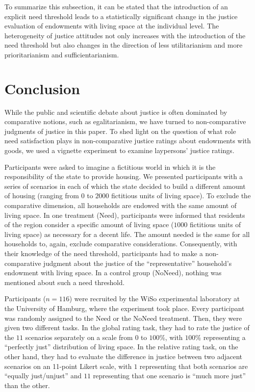 \documentclass[12pt]{scrartcl}
\begin{document}
To summarize this subsection, it can be stated that the introduction of an explicit need threshold leads to a statistically significant change in the justice evaluation of endowments with living space at the individual level.
The heterogeneity of justice attitudes not only increases with the introduction of the need threshold but also changes in the direction of less utilitarianism and more prioritarianism and sufficientarianism.


\section{Conclusion}\label{sec:conclusion}
While the public and scientific debate about justice is often dominated by comparative notions, such as egalitarianism, we have turned to non-comparative judgments of justice in this paper.
To shed light on the question of what role need satisfaction plays in non-comparative justice ratings about endowments with goods, we used a vignette experiment to examine laypersons' justice ratings.

Participants were asked to imagine a fictitious world in which it is the responsibility of the state to provide housing.
We presented participants with a series of scenarios in each of which the state decided to build a different amount of housing (ranging from $0$ to $2000$ fictitious units of living space).
To exclude the comparative dimension, all households are endowed with the same amount of living space.
In one treatment (Need), participants were informed that residents of the region consider a specific amount of living space ($1000$ fictitious units of living space) as necessary for a decent life.
The amount needed is the same for all households to, again, exclude comparative considerations.
Consequently, with their knowledge of the need threshold, participants had to make a non-comparative judgment about the justice of the ``representative'' household's endowment with living space.
In a control group (NoNeed), nothing was mentioned about such a need threshold.

Participants ($n=116$) were recruited by the WiSo experimental laboratory at the University of Hamburg, where the experiment took place.
Every participant was randomly assigned to the Need or the NoNeed treatment.
Then, they were given two different tasks.
In the global rating task, they had to rate the justice of the $11$ scenarios separately on a scale from $0$ to $100\%$, with $100\%$ representing a ``perfectly just'' distribution of living space.
In the relative rating task, on the other hand, they had to evaluate the difference in justice between two adjacent scenarios on an 11-point Likert scale, with $1$ representing that both scenarios are ``equally just/unjust'' and $11$ representing that one scenario is ``much more just'' than the other.
\end{document}
